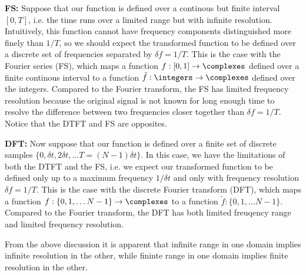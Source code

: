 \textbf{FS:} Suppose that our function is defined over a continous but finite interval $[0, T]$, i.e. the time runs over a limited range but with infinite resolution.
Intuitively, this function cannot have frequency components distinguished more finely than $1/T$, so we should expect the transformed function to be defined over a discrete set of frequencies separated by $\delta f = 1 / T$.
This is the case with the Fourier series (FS), which maps a function $f: [0, 1] \rightarrow \complexes$ defined over a finite continous interval to a function $\tilde f: \integers \rightarrow \complexes$ defined over the integers.
Compared to the Fourier transform, the FS has limited frequency resolution because the original signal is not known for long enough time to resolve the difference between two frequencies closer together than $\delta f = 1 / T$.
Notice that the DTFT and FS are opposites.

\textbf{DFT:} Now suppose that our function is defined over a finite set of discrete samples $\{0, \delta t, 2 \delta t,\ldots T = (N-1) \delta t\}$.
In this case, we have the limitations of both the DTFT and the FS, i.e. we expect our transformed function to be defined only up to a maximum frequency $1 / \delta t$ and only with frequency resolution $\delta f = 1 / T$.
This is the case with the discrete Fourier transform (DFT), which maps a function $f: \{0, 1,\ldots N-1\} \rightarrow \complexes$ to a function $\tilde f: \{0, 1,\ldots N-1\}$.
Compared to the Fourier transform, the DFT has both limited freuqency range and limited frequency resolution.

From the above discussion it is apparent that infinite range in one domain implies infinite resolution in the other, while fininte range in one domain implies finite resolution in the other.
